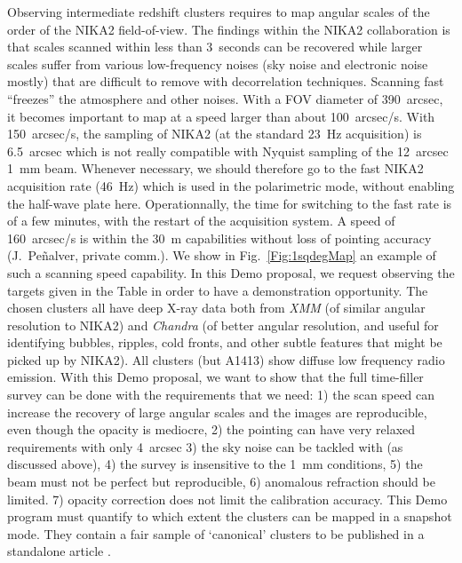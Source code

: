 \documentclass[10pt,a4paper,twoside,graphicx,color]{article}
\begin{document}
\vspace{-0.1cm}  Observing intermediate redshift clusters requires to map
angular scales of the order of the NIKA2 field-of-view. The findings
within the NIKA2 collaboration is that scales scanned within less than
3~seconds can be recovered while larger scales suffer from various
low-frequency noises (sky noise and electronic noise mostly) that are
difficult to remove with decorrelation techniques. Scanning fast
``freezes'' the atmosphere and other noises. With a FOV diameter of
390~arcsec, it becomes important to map at a speed larger than about
100~arcsec/s. With 150~arcsec/s, the sampling of NIKA2 (at the
standard 23~Hz acquisition) is 6.5~arcsec which is not really
compatible with Nyquist sampling of the 12~arcsec 1~mm beam. Whenever
necessary, we should therefore go to the fast NIKA2 acquisition rate
(46~Hz) which is used in the polarimetric mode, without enabling the
half-wave plate here. Operationnally, the time for switching to the
fast rate is of a few minutes, with the restart of the acquisition
system. A speed of 160~arcsec/s is within the 30~m capabilities
without loss of pointing accuracy (J.~Peñalver, private comm.). We
show in Fig.~\ref{Fig:1sqdegMap} an example of such a scanning speed
capability. In this Demo proposal, we request observing the targets
given in the Table in order to have a demonstration opportunity. The
chosen clusters all have deep X-ray data both from {\sl XMM} (of
similar angular resolution to NIKA2) and {\sl Chandra} (of better
angular resolution, and useful for identifying bubbles, ripples, cold
fronts, and other subtle features that might be picked up by
NIKA2). All clusters (but A1413) show diffuse low frequency radio
emission. With this Demo proposal, we want to show that the full
time-filler survey can be done with the requirements that we need: 1)
the scan speed can increase the recovery of large angular scales and
the images are reproducible, even though the opacity is mediocre, 2)
the pointing can have very relaxed requirements with only 4~arcsec 3)
the sky noise can be tackled with (as discussed above), 4) the survey
is insensitive to the 1~mm conditions, 5) the beam must not be perfect
but reproducible, 6) anomalous refraction should be limited. 7)
opacity correction does not limit the calibration accuracy. This Demo
program must quantify to which extent the clusters can be mapped in a
snapshot mode. They contain a fair sample of `canonical' clusters to
be published in a standalone article .
\end{document}
